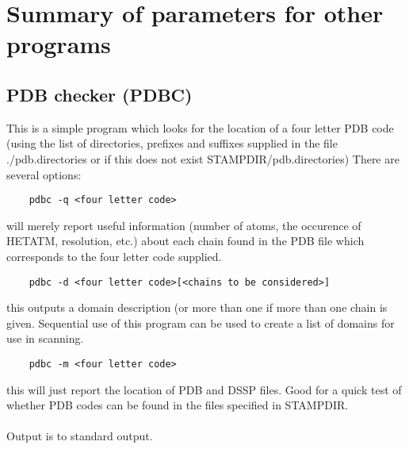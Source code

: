    \section{Summary of parameters for other programs}

    \subsection{PDB checker (PDBC)}

    This is a simple program which looks for the location of a four
    letter PDB code (using the list of directories, prefixes and
    suffixes supplied in the file ./pdb.directories or if this
    does not exist STAMPDIR/pdb.directories)
    There are several options:\\

    \begin{scriptsize}\begin{verbatim}
    pdbc -q <four letter code> 
    \end{verbatim} \end{scriptsize}

    will merely report useful information (number of atoms, the occurence of 
    HETATM, resolution, etc.) about each chain found in the PDB file which 
    corresponds to the four letter code supplied.\\

    \begin{scriptsize}\begin{verbatim}
    pdbc -d <four letter code>[<chains to be considered>]
    \end{verbatim} \end{scriptsize}

    this outputs a   domain description (or more than one if more than one 
    chain is   given.  Sequential use of this program can be used to create a 
    list of domains for use in scanning.\\

    \begin{scriptsize}\begin{verbatim}
    pdbc -m <four letter code>
    \end{verbatim} \end{scriptsize}

    this will just report the location of PDB and DSSP files.  Good for a 
    quick test of whether PDB codes  can be found in the files specified in 
    STAMPDIR.\\
    \\
    Output is to standard output.

